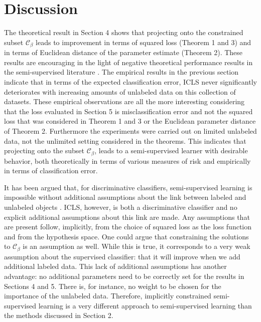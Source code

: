 \documentclass{elsarticle}
\newcommand{\Cb}{\mathcal{C}_{\beta}}
\begin{document}




\section{Discussion}
The theoretical result in Section 4 shows that projecting onto the constrained subset $\Cb$ leads to improvement in terms of squared loss (Theorem 1 and 3) and in terms of Euclidean distance of the parameter estimate (Theorem 2). These results are encouraging in the light of negative theoretical performance results in the semi-supervised literature \cite{Cozman2006}. The empirical results in the previous section indicate that in terms of the expected classification error, ICLS never significantly deteriorates with increasing amounts of unlabeled data on this collection of datasets. These empirical observations are all the more interesting considering that the loss evaluated in Section 5 is misclassification error and not the squared loss that was considered in Theorem 1 and 3 or the Euclidean parameter distance of Theorem 2. Furthermore the experiments were carried out on limited unlabeled data, not the unlimited setting considered in the theorems. This indicates that projecting onto the subset $\Cb$, leads to a semi-supervised learner with desirable behavior, both theoretically in terms of various measures of risk and empirically in terms of classification error.

It has been argued that, for discriminative classifiers, semi-supervised learning is impossible without additional assumptions about the link between labeled and unlabeled objects \cite{Seeger2001,Singh2008}. ICLS, however, is both a discriminative classifier and no explicit additional assumptions about this link are made. Any assumptions that are present follow, implicitly, from the choice of squared loss as the loss function and from the hypothesis space. One could argue that constraining the solutions to $\Cb$ is an assumption as well. While this is true, it corresponds to a very weak assumption about the supervised classifier: that it will improve when we add additional labeled data. This lack of additional assumptions has another advantage: no additional parameters need to be correctly set for the results in Sections 4 and 5. There is, for instance, no weight to be chosen for the importance of the unlabeled data. Therefore, implicitly constrained semi-supervised learning is a very different approach to semi-supervised learning than the methods discussed in Section 2.
\end{document}
